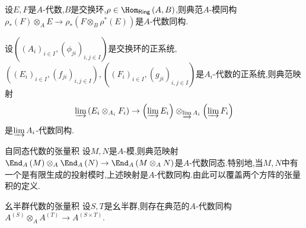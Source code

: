 \begin{proposition}{}{}
	设$E,F$是$A$-代数,$B$是交换环,$\rho\in\Hom_{\mathsf{Ring}}\left(A,B\right)$,则典范$A$-模同构$\rho_{\ast}\left(F\right)\otimes_{A}E\to\rho_{\ast}\left(F\otimes_{B}\rho^{\ast}\left(E\right)\right)$是$A$-代数同构.
\end{proposition}

\begin{proposition}{}{}
	设$\left(\left(A_{i}\right)_{i\in I},\left(\phi_{ji}\right)_{i,j\in I}\right)$是交换环的正系统,$\left(\left(E_{i}\right)_{i\in I},\left(f_{ji}\right)_{i,j\in I}\right),\left(\left(F_{i}\right)_{i\in I},\left(g_{ji}\right)_{i,j\in I}\right)$是$A_{i}$-代数的正系统,则典范映射
	\begin{align*}
		\varinjlim\left(E_{i}\otimes_{A_{i}}F_{i}\right)\to\left(\varinjlim E_{i}\right)\otimes_{\varinjlim A_{i}}\left(\varinjlim F_{i}\right)
	\end{align*}
	是$\varinjlim A_{i}$-代数同构.
\end{proposition}

\begin{example}{自同态代数的张量积}{}
	设$M,N$是$A$-模,则典范映射$\End_{A}\left(M\right)\otimes_{A}\End_{A}\left(N\right)\to\End_{A}\left(M\otimes_{A}N\right)$是$A$-代数同态.特别地,当$M,N$中有一个是有限生成的投射模时,上述映射是$A$-代数同构.由此可以覆盖两个方阵的张量积的定义.
\end{example}

\begin{example}{幺半群代数的张量积}{}
	设$S,T$是幺半群,则存在典范的$A$-代数同构$A^{\left(S\right)}\otimes_{A}A^{\left(T\right)}\to A^{\left(S\times T\right)}$.
\end{example}














